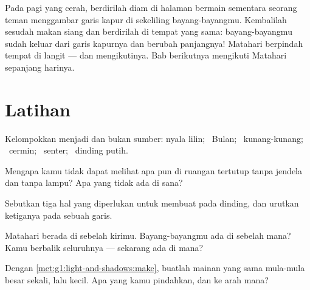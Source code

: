 \begin{example}\label{ex:g1:light-and-shadows:chalk}
Pada pagi yang cerah, berdirilah diam di halaman bermain sementara
seorang teman menggambar garis kapur di sekeliling bayang-bayangmu.
Kembalilah sesudah makan siang dan berdirilah di tempat yang sama:
bayang-bayangmu sudah keluar dari garis kapurnya dan berubah
panjangnya! Matahari berpindah tempat di langit --- dan 
mengikutinya. Bab berikutnya mengikuti Matahari sepanjang harinya.
\end{example}

\section{Latihan}

\begin{exercise}[$\star$]\label{exo:g1:light-and-shadows:1}
Kelompokkan menjadi  dan bukan sumber: nyala lilin; \ Bulan;
\ kunang-kunang; \ cermin; \ senter; \ dinding putih.
\end{exercise}

\begin{exercise}[$\star$]\label{exo:g1:light-and-shadows:2}
Mengapa kamu tidak dapat melihat apa pun di ruangan tertutup tanpa
jendela dan tanpa lampu? Apa yang tidak ada di sana?
\end{exercise}

\begin{exercise}[$\star$]\label{exo:g1:light-and-shadows:3}
Sebutkan tiga hal yang diperlukan untuk membuat  pada
dinding, dan urutkan ketiganya pada sebuah garis.
\end{exercise}

\begin{exercise}[$\star$]\label{exo:g1:light-and-shadows:4}
Matahari berada di sebelah kirimu. Bayang-bayangmu ada di sebelah
mana? Kamu berbalik seluruhnya --- sekarang ada di mana?
\end{exercise}

\begin{exercise}[$\star$]\label{exo:g1:light-and-shadows:5}
Dengan \cref{met:g1:light-and-shadows:make}, buatlah 
mainan yang sama mula-mula besar sekali, lalu kecil. Apa yang kamu
pindahkan, dan ke arah mana?
\end{exercise}

